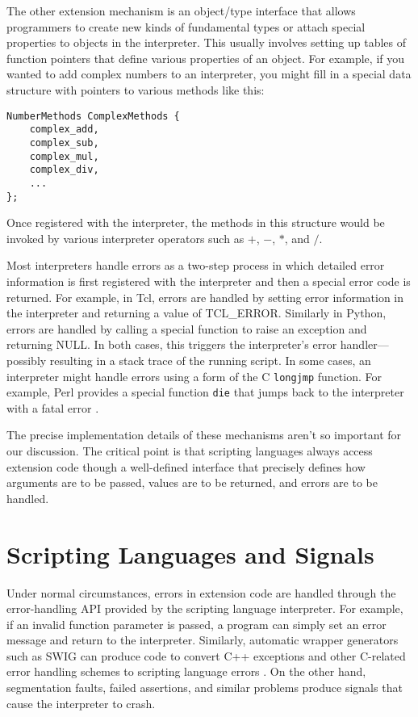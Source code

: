 The other extension mechanism is an object/type interface that allows programmers to create new
kinds of fundamental types or attach special properties to objects in
the interpreter.  This usually involves setting up tables of function
pointers that define various properties of an object.  For example, if
you wanted to add complex numbers to an interpreter, you might fill in a special
data structure with pointers to various methods like this:

\begin{verbatim}
NumberMethods ComplexMethods {
    complex_add,
    complex_sub,
    complex_mul,
    complex_div,
    ...
};
\end{verbatim}

\noindent
Once registered with the interpreter, the methods in this structure
would be invoked by various interpreter operators such as $+$,
$-$, $*$, and $/$.

Most interpreters handle errors as a two-step process in which
detailed error information is first registered with the interpreter
and then a special error code is returned. For example, in Tcl, errors
are handled by setting error information in the interpreter and
returning a value of TCL\_ERROR.  Similarly in Python, errors are
handled by calling a special function to raise an exception and returning NULL.  In both cases,
this triggers the interpreter's error handler---possibly resulting in
a stack trace of the running script.  In some cases, an interpreter
might handle errors using a form of the C {\tt longjmp} function. 
For example, Perl provides a special function {\tt die} that jumps back
to the interpreter with a fatal error \cite{advperl}.

The precise implementation details of these mechanisms aren't so
important for our discussion.  The critical point is that scripting
languages always access extension code though a well-defined interface
that precisely defines how arguments are to be passed, values are to be
returned, and errors are to be handled.

\section{Scripting Languages and Signals}

Under normal circumstances, errors in extension code are handled
through the error-handling API provided by the scripting language
interpreter.  For example, if an invalid function parameter is passed,
a program can simply set an error message and return to the
interpreter.  Similarly, automatic wrapper generators such as SWIG can produce
code to convert C++ exceptions and other C-related error handling
schemes to scripting language errors \cite{swigexcept}. On the other
hand, segmentation faults, failed assertions, and similar problems
produce signals that cause the interpreter to crash.


